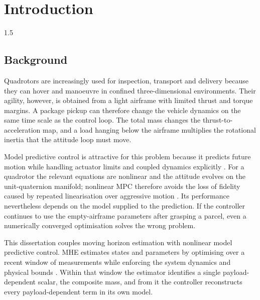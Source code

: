 
\chapter{Introduction}
\label{ch:introduction}
\begin{spacing}{1.5}
\setlength{\parskip}{0.22in}

\section{Background}

Quadrotors are increasingly used for inspection, transport and delivery because
they can hover and manoeuvre in confined three-dimensional environments. Their
agility, however, is obtained from a light airframe with limited thrust and
torque margins. A package pickup can therefore change the vehicle dynamics on the
same time scale as the control loop. The total mass changes the
thrust-to-acceleration map, and a load hanging below the airframe multiplies the
rotational inertia that the attitude loop must move.

Model predictive control is attractive for this problem because it predicts
future motion while handling actuator limits and coupled dynamics explicitly
\cite{rawlings2017mpc,mayne2014mpc}. For a quadrotor the relevant equations are
nonlinear and the attitude evolves on the unit-quaternion manifold; nonlinear MPC
therefore avoids the loss of fidelity caused by repeated linearisation over
aggressive motion \cite{grune2017nmpc,kamel2017linear}. Its performance
nevertheless depends on the model supplied to the prediction. If the controller
continues to use the empty-airframe parameters after grasping a parcel, even a
numerically converged optimisation solves the wrong problem.

This dissertation couples moving horizon estimation with nonlinear model
predictive control. MHE estimates states and parameters by optimising over a
recent window of measurements while enforcing the system dynamics and physical
bounds \cite{rao2003}. Within that window the estimator identifies a single
payload-dependent scalar, the composite mass, and from it the controller
reconstructs every payload-dependent term in its own model.


\end{spacing}
